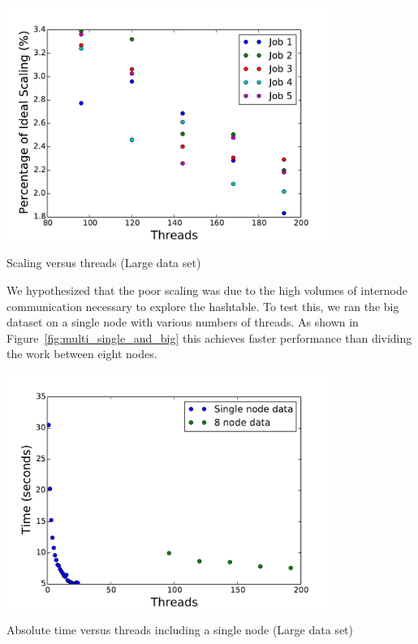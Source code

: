 \documentclass{article}
\begin{document}
\begin{minipage}{\linewidth}
  \captionsetup{type=figure}
  \begin{center}
  \includegraphics[width=0.8\textwidth]{LargeMultScaling.pdf}
  \end{center}
  \caption{Scaling versus threads (Large data set)} \label{fig:large_mult_times_scaling}
\end{minipage}

We hypothesized that the poor scaling was due to the high volumes of internode communication necessary to explore the hashtable. To test this, we ran the big dataset on a single node with various numbers of threads. As shown in Figure~\ref{fig:multi_single_and_big} this achieves faster performance than dividing the work between eight nodes.

\begin{minipage}{\linewidth}
  \captionsetup{type=figure}
  \begin{center}
  \includegraphics[width=0.8\textwidth]{MultiANDSingleBIGtime.pdf}
  \end{center}
  \caption{Absolute time versus threads including a single node (Large data set)} \label{fig:multi_single_and_big}
\end{minipage}
\end{document}
